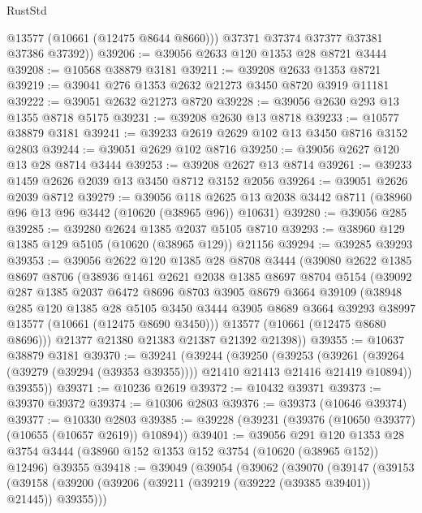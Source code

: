 \begin{lexlean}{RustStd}
\begin{coremodule}
          @13577
          (@10661 (@12475 @8644 @8660)))
        @37371
        @37374
        @37377
        @37381
        @37386
        @37392))
@39206 := @39056 @2633 @120 @1353 @28 @8721 @3444
@39208 := @10568 @38879 @3181
@39211 := @39208 @2633 @1353 @8721
@39219 := @39041 @276 @1353 @2632 @21273 @3450 @8720 @3919 @11181
@39222 := @39051 @2632 @21273 @8720
@39228 := @39056 @2630 @293 @13 @1355 @8718 @5175
@39231 := @39208 @2630 @13 @8718
@39233 := @10577 @38879 @3181
@39241 := @39233 @2619 @2629 @102 @13 @3450 @8716 @3152 @2803
@39244 := @39051 @2629 @102 @8716
@39250 := @39056 @2627 @120 @13 @28 @8714 @3444
@39253 := @39208 @2627 @13 @8714
@39261 := @39233 @1459 @2626 @2039 @13 @3450 @8712 @3152 @2056
@39264 := @39051 @2626 @2039 @8712
@39279 := @39056
    @118
    @2625
    @13
    @2038
    @3442
    @8711
    (@38960 @96 @13 @96 @3442 (@10620 (@38965 @96)) @10631)
@39280 := @39056 @285
@39285 := @39280 @2624 @1385 @2037 @5105 @8710
@39293 := @38960 @129 @1385 @129 @5105 (@10620 (@38965 @129)) @21156
@39294 := @39285 @39293
@39353 := @39056
    @2622
    @120
    @1385
    @28
    @8708
    @3444
    (@39080
      @2622
      @1385
      @8697
      @8706
      (@38936
        @1461
        @2621
        @2038
        @1385
        @8697
        @8704
        @5154
        (@39092
          @287
          @1385
          @2037
          @6472
          @8696
          @8703
          @3905
          @8679
          @3664
          @39109
          (@38948
            @285
            @120
            @1385
            @28
            @5105
            @3450
            @3444
            @3905
            @8689
            @3664
            @39293
            @38997
            @13577
            (@10661 (@12475 @8690 @3450)))
          @13577
          (@10661 (@12475 @8680 @8696)))
        @21377
        @21380
        @21383
        @21387
        @21392
        @21398))
@39355 := @10637 @38879 @3181
@39370 := @39241
    (@39244
      (@39250
        (@39253
          (@39261 (@39264 (@39279 (@39294 (@39353 @39355)))) @21410 @21413 @21416 @21419 @10894))
        @39355))
@39371 := @10236 @2619
@39372 := @10432 @39371
@39373 := @39370 @39372
@39374 := @10306 @2803
@39376 := @39373 (@10646 @39374)
@39377 := @10330 @2803
@39385 := @39228 (@39231 (@39376 (@10650 @39377) (@10655 (@10657 @2619)) @10894))
@39401 := @39056
    @291
    @120
    @1353
    @28
    @3754
    @3444
    (@38960 @152 @1353 @152 @3754 (@10620 (@38965 @152)) @12496)
    @39355
@39418 := @39049
    (@39054
      (@39062
        (@39070
          (@39147
            (@39153
              (@39158 (@39200 (@39206 (@39211 (@39219 (@39222 (@39385 @39401)) @21445)) @39355)))

\end{coremodule}
\end{lexlean}
